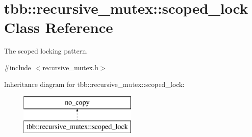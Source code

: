 \hypertarget{classtbb_1_1recursive__mutex_1_1scoped__lock}{}\section{tbb\+:\+:recursive\+\_\+mutex\+:\+:scoped\+\_\+lock Class Reference}
\label{classtbb_1_1recursive__mutex_1_1scoped__lock}


The scoped locking pattern.  




{\ttfamily \#include $<$recursive\+\_\+mutex.\+h$>$}

Inheritance diagram for tbb\+:\+:recursive\+\_\+mutex\+:\+:scoped\+\_\+lock\+:\begin{figure}[H]
\begin{center}
\leavevmode
\includegraphics[height=2.000000cm]{classtbb_1_1recursive__mutex_1_1scoped__lock}
\end{center}
\end{figure}
